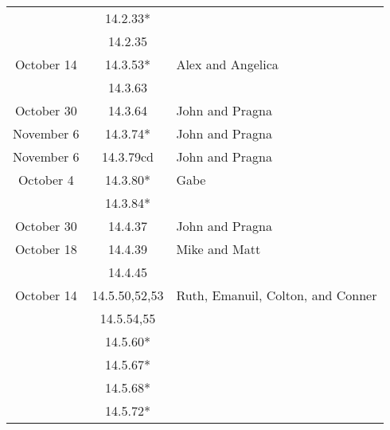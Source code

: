 \documentclass[12pt]{amsart}
\begin{document}
\begin{longtable}{c|c|l}
                        & 14.2.33*                             &                                          \\
                        & 14.2.35                              &                                          \\
        October 14      & 14.3.53*                             & Alex and Angelica                        \\
                        & 14.3.63                              &                                          \\
        October 30      & 14.3.64                              & John and Pragna                          \\
        November 6      & 14.3.74*                             & John and Pragna                          \\
        November 6      & 14.3.79cd                            & John and Pragna                          \\
        October 4       & 14.3.80*                             & Gabe                                     \\
                        & 14.3.84*                             &                                          \\
        October 30      & 14.4.37                              & John and Pragna                          \\
        October 18      & 14.4.39                              & Mike and Matt                            \\
                        & 14.4.45                              &                                          \\
        October 14      & 14.5.50,52,53                        & Ruth, Emanuil, Colton, and Conner        \\
                        & 14.5.54,55                           &                                          \\
                        & 14.5.60*                             &                                          \\
                        & 14.5.67*                             &                                          \\
                        & 14.5.68*                             &                                          \\
                        & 14.5.72*                             &                                          \\

\end{longtable}
\end{document}
